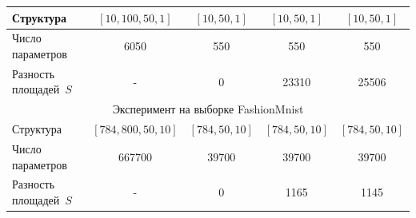 \documentclass[12pt]{a&t}
\begin{document}
\begin{table}[]
\begin{center}
{\begin{tabular}{|l|c|c|c|c|}
    Структура                  & $[10,100,50,1]$   & $[10,50,1]$                                                              & $[10,50,1]$                                                                          & $[10,50,1]$                                                                      \\ \hline
    Число параметров           & 6050              & 550                                                                      & 550                                                                                  & 550                                                                              \\ \hline
    Разность площадей~$S$ & -                 & 0                                                                        & 23310                                                                                & 25506                                                                            \\ \hline
    \multicolumn{5}{|c|}{Эксперимент на выборке FashionMnist}                                                                                                                                                                                                                                           \\ \hline
    Структура                  & $[784,800,50,10]$ & $[784,50,10]$                                                            & $[784,50,10]$                                                                        & $[784,50,10]$                                                                    \\ \hline
    Число параметров           & 667700            & 39700                                                                    & 39700                                                                                & 39700                                                                            \\ \hline
    Разность площадей~$S$ & -                 & 0                                                                        & 1165                                                                                 & 1145                                                                             \\ \hline
    \end{tabular}
}
\end{center}
\end{table}
\end{document}
